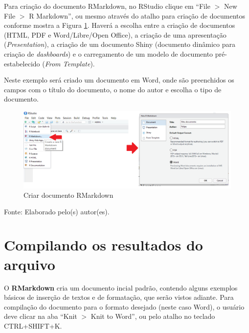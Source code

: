 \documentclass[12pt,brazil,oneside]{book}
\begin{document}
Para criação do documento RMarkdown, no RStudio clique em ``File \(>\)
New File \(>\) R Markdown'', ou mesmo através do atalho para criação de
documentos conforme mostra a Figura \ref{fig:criararq1}. Haverá a
escolha entre a criação de documentos (HTML, PDF e Word/Libre/Open
Office), a criação de uma apresentação (\emph{Presentation}), a criação
de um documento Shiny (documento dinâmico para criação de
\emph{dashboards}) e o carregamento de um modelo de documento
pré-estabelecido (\emph{From Template}).

Neste exemplo será criado um documento em Word, onde são preenchidos os
campos com o título do documento, o nome do autor e escolha o tipo de
documento.

\begin{figure}[H]

{\centering \includegraphics[width=0.8\linewidth]{criararq1} 

}

\caption{Criar documento RMarkdown}\label{fig:criararq1}
\end{figure}

Fonte: Elaborado pelo(s) autor(es).

\hypertarget{compilando-os-resultados-do-arquivo}{%
\section{Compilando os resultados do
arquivo}\label{compilando-os-resultados-do-arquivo}}

O \textbf{RMarkdown} cria um documento incial padrão, contendo alguns
exemplos básicos de inserção de textos e de formatação, que serão vistos
adiante. Para compilação do documento para o formato desejado (neste
caso Word), o usuário deve clicar na aba ``Knit \(>\) Knit to Word'', ou
pelo atalho no teclado CTRL+SHIFT+K.
\end{document}
